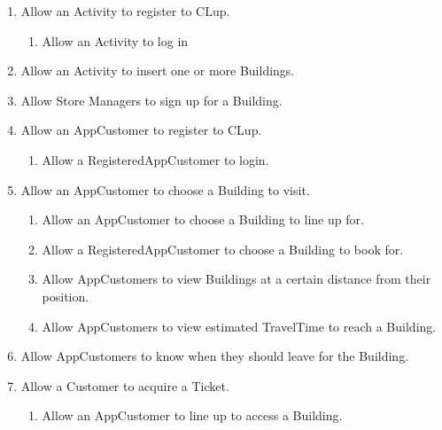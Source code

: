 \documentclass{article}
\begin{document}
	 \renewcommand{\theenumi}{[G\,\arabic{enumi}]}
	 \begin{enumerate}
	 \color{BrickRed}
	 	\item Allow an Activity to register to CLup.
		\renewcommand{\labelenumii}{\theenumii}
		\renewcommand{\theenumi}{G\,\arabic{enumi}}
		\renewcommand{\theenumii}{[\theenumi.\arabic{enumii}].}
		\begin{enumerate}
			\item Allow an Activity to log in
		\end{enumerate}
		\renewcommand{\theenumi}{[G\,\arabic{enumi}]}
		\item Allow an Activity to insert one or more Buildings.
		\item Allow Store Managers to sign up for a Building.
		\item Allow an AppCustomer to register to CLup.
		\renewcommand{\labelenumii}{\theenumii}
		\renewcommand{\theenumi}{G\,\arabic{enumi}}
		\renewcommand{\theenumii}{[\theenumi.\arabic{enumii}].}
		\begin{enumerate}
			\item Allow a RegisteredAppCustomer to login.
		\end{enumerate}
		\renewcommand{\theenumi}{[G\,\arabic{enumi}]}
		\item Allow an AppCustomer to choose a Building to visit.
		\renewcommand{\labelenumii}{\theenumii}
		\renewcommand{\theenumi}{G\,\arabic{enumi}}
		\renewcommand{\theenumii}{[\theenumi.\arabic{enumii}].}
		\begin{enumerate}
			\item Allow an AppCustomer to choose a Building to line up for.
			\item Allow a RegisteredAppCustomer to choose a Building to book for.
			\item Allow AppCustomers to view Buildings at a certain distance from their position.
			\item Allow AppCustomers to view estimated TravelTime to reach a Building.
		\end{enumerate}
		\renewcommand{\theenumi}{[G\,\arabic{enumi}]}
		\item Allow AppCustomers to know when they should leave for the Building.
		\item Allow a Customer to acquire a Ticket.
		\renewcommand{\labelenumii}{\theenumii}
		\renewcommand{\theenumi}{G\,\arabic{enumi}}
		\renewcommand{\theenumii}{[\theenumi.\arabic{enumii}].}
		\begin{enumerate}
			\item Allow an AppCustomer to line up to access a Building.

\end{enumerate}
\end{enumerate}
\end{document}
